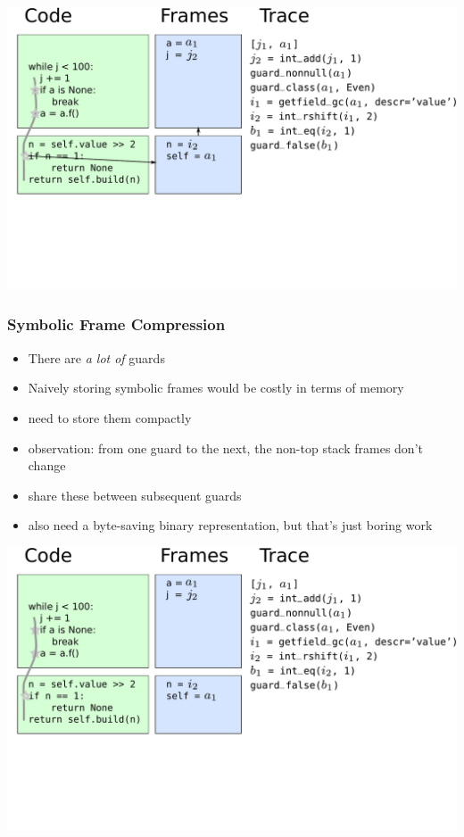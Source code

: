 \documentclass[utf8x]{beamer}
\begin{document}
\begin{frame}
  \includegraphics[scale=0.4]{figures/framechain1}
\end{frame}


\begin{frame}
  \frametitle{Symbolic Frame Compression}
  \begin{itemize}
      \item There are \emph{a lot of} guards
      \item Naively storing symbolic frames would be costly in terms of memory
      \item need to store them compactly
      \item observation: from one guard to the next, the non-top stack frames don't change
      \item share these between subsequent guards
      \pause
      \item also need a byte-saving binary representation, but that's just boring work
  \end{itemize}
\end{frame}

\begin{frame}
  \includegraphics[scale=0.4]{figures/loop07}
\end{frame}
\end{document}
